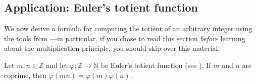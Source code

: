 \subsection*{Application: Euler's totient function}

We now derive a formula for computing the totient of an arbitrary integer using the tools from ---in particular, if you chose to read this section \textit{before} learning about the multiplication principle, you should skip over this material.

\begin{theorem}
\label{thmTotientIsMultiplicative}
Let $m,n \in \mathbb{Z}$ and let $\varphi : \mathbb{Z} \to \mathbb{N}$ be Euler's totient function (see ). If $m$ and $n$ are coprime, then $\varphi(mn) = \varphi(m)\varphi(n)$.
\end{theorem}
